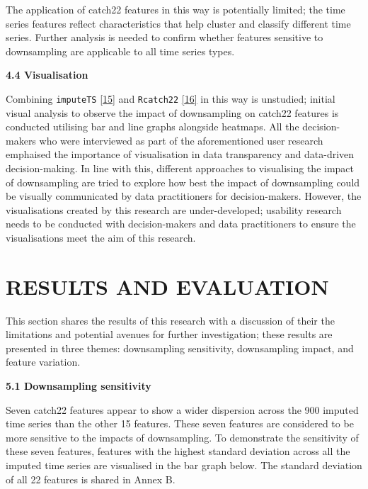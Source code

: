 \documentclass{article}
\begin{document}
The application of catch22 features in this way is potentially limited;
the time series features reflect characteristics that help cluster and
classify different time series. Further analysis is needed to confirm
whether features sensitive to downsampling are applicable to all time
series types.

\textbf{4.4 Visualisation}

Combining \texttt{imputeTS} \protect\hyperlink{ref-imputeTS_R}{{[}15{]}}
and \texttt{Rcatch22} \protect\hyperlink{ref-catch22_R}{{[}16{]}} in
this way is unstudied; initial visual analysis to observe the impact of
downsampling on catch22 features is conducted utilising bar and line
graphs alongside heatmaps. All the decision-makers who were interviewed
as part of the aforementioned user research emphaised the importance of
visualisation in data transparency and data-driven decision-making. In
line with this, different approaches to visualising the impact of
downsampling are tried to explore how best the impact of downsampling
could be visually communicated by data practitioners for
decision-makers. However, the visualisations created by this research
are under-developed; usability research needs to be conducted with
decision-makers and data practitioners to ensure the visualisations meet
the aim of this research.

\hypertarget{results-and-evaluation}{%
\section{RESULTS AND EVALUATION}\label{results-and-evaluation}}

\vspace{-0.38cm}

This section shares the results of this research with a discussion of
their the limitations and potential avenues for further investigation;
these results are presented in three themes: downsampling sensitivity,
downsampling impact, and feature variation.

\textbf{5.1 Downsampling sensitivity}

Seven catch22 features appear to show a wider dispersion across the 900
imputed time series than the other 15 features. These seven features are
considered to be more sensitive to the impacts of downsampling. To
demonstrate the sensitivity of these seven features, features with the
highest standard deviation across all the imputed time series are
visualised in the bar graph below. The standard deviation of all 22
features is shared in Annex B.
\end{document}
